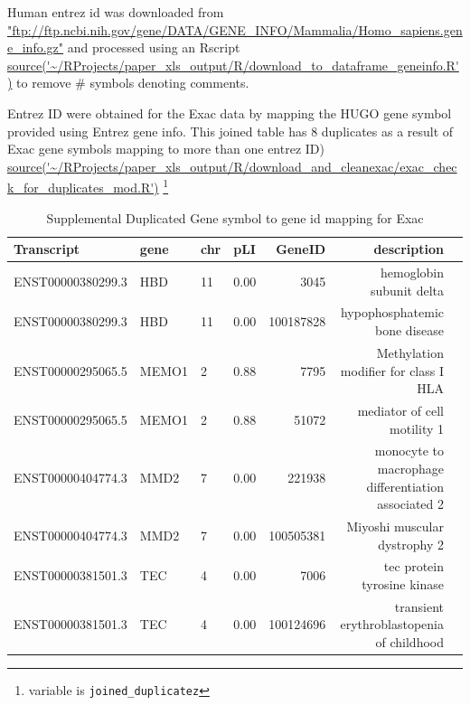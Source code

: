 
Human entrez id was downloaded from
\url{"ftp://ftp.ncbi.nih.gov/gene/DATA/GENE_INFO/Mammalia/Homo_sapiens.gene_info.gz"} and processed using an Rscript \url{source('~/RProjects/paper_xls_output/R/download_to_dataframe_geneinfo.R')} to remove \# symbols denoting comments. 





Entrez ID were obtained for the Exac data by mapping the  HUGO gene symbol provided using Entrez gene info. This joined table has 8 duplicates as a result of Exac gene symbols mapping to more than one entrez ID)
\url{source('~/RProjects/paper_xls_output/R/download_and_cleanexac/exac_check_for_duplicates_mod.R')}
\footnote{variable is
\texttt{joined\_duplicatez}}
\begin{table}[ht]
\centering
\begin{adjustbox}{width=\textwidth}

\begin{tabular}{llllrrl}
  \hline
Transcript & gene & chr & pLI & GeneID & description \\ 
  \hline
 ENST00000380299.3 & HBD & 11 & 0.00 & 3045 & hemoglobin subunit delta \\ 
 ENST00000380299.3 & HBD & 11 & 0.00 & 100187828 & hypophosphatemic bone disease \\ 
 ENST00000295065.5 & MEMO1 & 2 & 0.88 & 7795 & Methylation modifier for class I HLA \\ 
 ENST00000295065.5 & MEMO1 & 2 & 0.88 & 51072 & mediator of cell motility 1 \\ 
 ENST00000404774.3 & MMD2 & 7 & 0.00 & 221938 & monocyte to macrophage differentiation associated 2 \\ 
 ENST00000404774.3 & MMD2 & 7 & 0.00 & 100505381 & Miyoshi muscular dystrophy 2 \\ 
 ENST00000381501.3 & TEC & 4 & 0.00 & 7006 & tec protein tyrosine kinase \\ 
 ENST00000381501.3 & TEC & 4 & 0.00 & 100124696 & transient erythroblastopenia of childhood \\ 
   \hline
\end{tabular}
\end{adjustbox}
\caption{Supplemental Duplicated Gene symbol to gene id mapping for Exac}
\label{tab:supp duplicated gene symbol for exac entrez}
\end{table}



